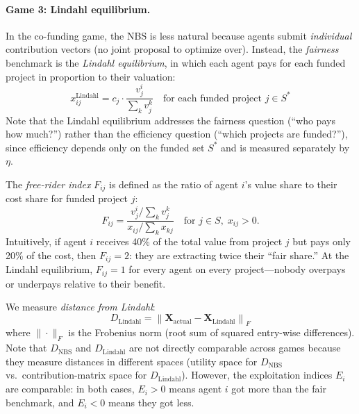 \paragraph{Game 3: Lindahl equilibrium.}
In the co-funding game, the NBS is less natural because agents submit \emph{individual} contribution vectors (no joint proposal to optimize over).
Instead, the \emph{fairness} benchmark is the \emph{Lindahl equilibrium}, in which each agent pays for each funded project in proportion to their valuation:
\begin{equation}
    x^{\text{Lindahl}}_{ij} = c_j \cdot \frac{v^i_j}{\sum_k v^k_j} \quad \text{for each funded project } j \in S^*
\end{equation}
Note that the Lindahl equilibrium addresses the fairness question (``who pays how much?'') rather than the efficiency question (``which projects are funded?''), since efficiency depends only on the funded set $S^*$ and is measured separately by $\eta$.

The \emph{free-rider index} $F_{ij}$ is defined as the ratio of agent $i$'s value share to their cost share for funded project $j$:
\begin{equation}
    F_{ij} = \frac{v^i_j / \sum_k v^k_j}{x_{ij} / \sum_k x_{kj}} \quad \text{for } j \in S, \; x_{ij} > 0.
\end{equation}
Intuitively, if agent $i$ receives 40\% of the total value from project $j$ but pays only 20\% of the cost, then $F_{ij} = 2$: they are extracting twice their ``fair share.''
At the Lindahl equilibrium, $F_{ij} = 1$ for every agent on every project---nobody overpays or underpays relative to their benefit.

We measure \emph{distance from Lindahl}:
\begin{equation}
    D_{\text{Lindahl}} = \left\|\bm{X}_{\text{actual}} - \bm{X}_{\text{Lindahl}}\right\|_F
\end{equation}
where $\|\cdot\|_F$ is the Frobenius norm (root sum of squared entry-wise differences).
Note that $D_{\text{NBS}}$ and $D_{\text{Lindahl}}$ are not directly comparable across games because they measure distances in different spaces (utility space for $D_{\text{NBS}}$ vs.\ contribution-matrix space for $D_{\text{Lindahl}}$).
However, the exploitation indices $E_i$ are comparable: in both cases, $E_i > 0$ means agent $i$ got more than the fair benchmark, and $E_i < 0$ means they got less.

